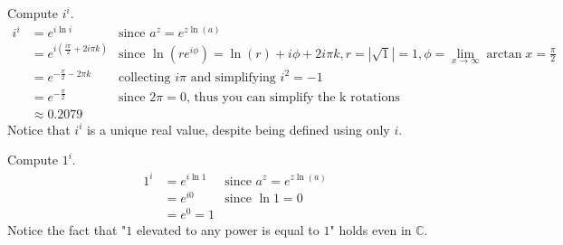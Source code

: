   Compute $i^i$.
  \begin{align*}
    i^i & = e^{i\ln i}
        & \text{since } a^z = e^{z\ln(a)} \\
        & = e^{i\left(\frac{i\pi}{2} + 2i\pi k\right)}
        & \text{since } \ln(re^{i\phi}) = \ln(r) + i\phi + 2i\pi k,
                        r = |\sqrt1| = 1,
                        \phi = \lim_{x \to \infty}\arctan{x} = \frac{\pi}{2} \\
        & = e^{-\frac{\pi}{2}-2\pi k}
        & \text{collecting } i\pi \text{ and simplifying } i^2 = -1 \\
        & = e^{-\frac{\pi}{2}}
        & \text{since } 2\pi = 0 \text{, thus you can simplify the k rotations} \\
        & \approx 0.2079
  \end{align*}
  Notice that $i^i$ is a unique real value, despite being defined using only $i$.

  Compute $1^i$.
  \begin{align*}
    1^i & = e^{i\ln 1}
        & \text{since } a^z = e^{z\ln(a)} \\
        & = e^{i0}
        & \text{since } \ln1 = 0 \\
        & = e^{0} = 1
  \end{align*}
  Notice the fact that "$1$ elevated to any power is equal to $1$" holds even in $\mathbb{C}$.
